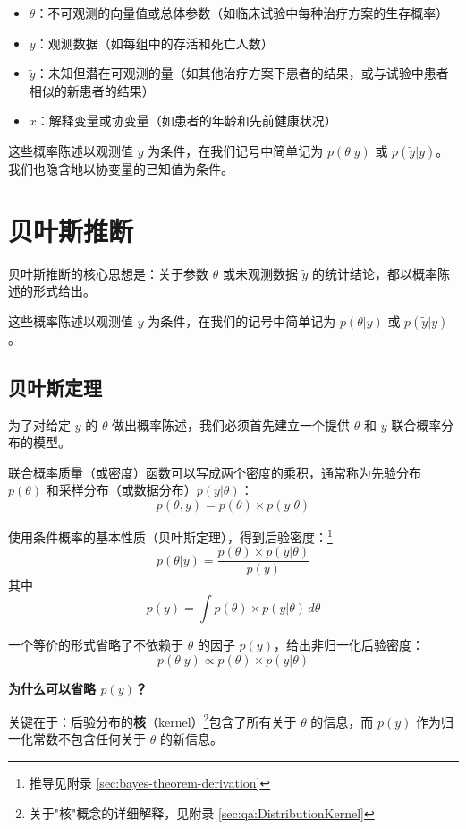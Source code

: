 \begin{itemize}
  \item $\theta$：不可观测的向量值或总体参数（如临床试验中每种治疗方案的生存概率）

  \item $y$：观测数据（如每组中的存活和死亡人数）

  \item $\tilde{y}$：未知但潜在可观测的量（如其他治疗方案下患者的结果，或与试验中患者相似的新患者的结果）

  \item $x$：解释变量或协变量（如患者的年龄和先前健康状况）
\end{itemize}

这些概率陈述以观测值 $y$ 为条件，在我们记号中简单记为 $p(\theta|y)$ 或 $p(\tilde{y}|y)$。我们也隐含地以协变量的已知值为条件。

\section{贝叶斯推断}

贝叶斯推断的核心思想是：关于参数 $\theta$ 或未观测数据 $\tilde{y}$ 的统计结论，都以概率陈述的形式给出。

这些概率陈述以观测值 $y$ 为条件，在我们的记号中简单记为 $p(\theta|y)$ 或 $p(\tilde{y}|y)$。

\subsection{贝叶斯定理}

为了对给定 $y$ 的 $\theta$ 做出概率陈述，我们必须首先建立一个提供 $\theta$ 和 $y$ 联合概率分布的模型。

联合概率质量（或密度）函数可以写成两个密度的乘积，通常称为先验分布 $p(\theta)$ 和采样分布（或数据分布）$p(y|\theta)$：
\[
p(\theta, y) = p(\theta) \times p(y|\theta)
\]

使用条件概率的基本性质（贝叶斯定理），得到后验密度：\footnote{推导见附录 \cref{sec:bayes-theorem-derivation}}
\[
p(\theta|y) = \frac{p(\theta) \times p(y|\theta)}{p(y)}
\]
其中
\[
p(y) = \int p(\theta) \times p(y|\theta) \, d\theta
\]

一个等价的形式省略了不依赖于 $\theta$ 的因子 $p(y)$，给出非归一化后验密度：
\[
p(\theta|y) \propto p(\theta) \times p(y|\theta)
\]

\textbf{为什么可以省略 $p(y)$？}

关键在于：后验分布的\textbf{核}（kernel）\footnote{关于"核"概念的详细解释，见附录 \cref{sec:qa:DistributionKernel}}包含了所有关于 $\theta$ 的信息，而 $p(y)$ 作为归一化常数不包含任何关于 $\theta$ 的新信息。

